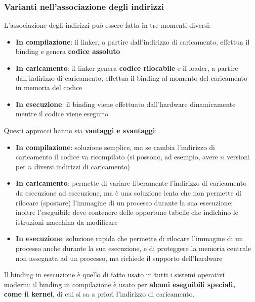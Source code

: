 \documentclass[12pt]{article}
\begin{document}
\subsubsection{Varianti nell'associazione degli indirizzi}
L'associazione degli indirizzi può essere fatta in tre momenti diversi:
\begin{itemize}
    \item \textbf{In compilazione}: il linker, a partire dall'indirizzo di caricamento, effettua il binding e genera \textbf{codice assoluto}
    \item \textbf{In caricamento}: il linker genera \textbf{codice rilocabile} e il loader, a partire dall'indirizzo di caricamento, effettua il binding al momento del caricamento in memoria del codice
    \item \textbf{In esecuzione}: il binding viene effettuato dall'hardware dinamicamente mentre il codice viene eseguito
\end{itemize}
Questi approcci hanno sia \textbf{vantaggi e svantaggi}:
\begin{itemize}
    \item \textbf{In compilazione}: soluzione semplice, ma se cambia l'indirizzo di caricamento il codice va ricompilato (si possono, ad esempio, avere $n$ versioni per $n$ diversi indirizzi di caricamento)
    \item \textbf{In caricamento}: permette di variare liberamente l'indirizzo di caricamento da esecuzione ad esecuzione, ma è una soluzione lenta che non permette di rilocare (spostare) l'immagine di un processo durante la sua
    esecuzione; inoltre l'eseguibile deve contenere delle opportune tabelle che indichino le istruzioni macchina da modificare
    \item \textbf{In esecuzione}: soluzione rapida che permette di rilocare l'immagine di un processo anche durante la sua esecuzione, e di proteggere la memoria centrale non assegnata ad un processo, ma richiede il supporto dell'hardware
\end{itemize}
Il binding in esecuzione è quello di fatto usato in tutti i sistemi operativi moderni; il binding in compilazione è usato per \textbf{alcuni eseguibili speciali, come il kernel}, di cui si sa a priori l'indirizzo di caricamento.
\end{document}
